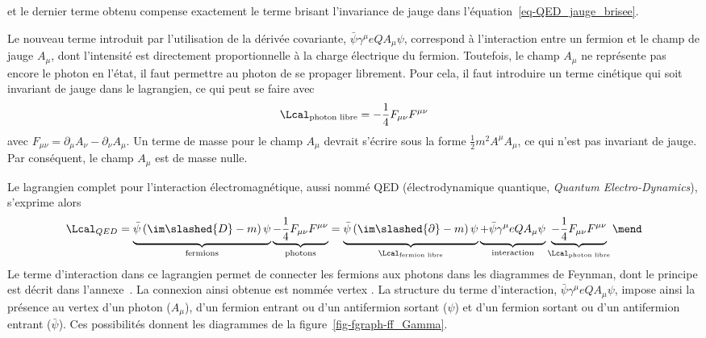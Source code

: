 et le dernier terme obtenu compense exactement le terme brisant l'invariance de jauge dans l'équation~\eqref{eq-QED_jauge_brisee}.
\par Le nouveau terme introduit par l'utilisation de la dérivée covariante, $\bar{\psi}\gamma^\mu eQA_\mu \psi$, correspond à l'interaction entre un fermion et le champ de jauge $A_\mu$, dont l'intensité est directement proportionnelle à la charge électrique du fermion.
Toutefois, le champ $A_\mu$ ne représente pas encore le photon en l'état, il faut permettre au photon de se propager librement. Pour cela, il faut introduire un terme cinétique qui soit invariant de jauge dans le lagrangien, ce qui peut se faire avec
\begin{equation}
\Lcal_{\text{photon libre}} = - \frac{1}{4} F_{\mu\nu}F^{\mu\nu}
\end{equation}
avec $F_{\mu\nu} = \partial_\mu A_\nu - \partial_\nu A_\mu$.
Un terme de masse pour le champ $A_\mu$ devrait s'écrire sous la forme $\frac{1}{2}m^2A^\mu A_\mu$, ce qui n'est pas invariant de jauge. Par conséquent, le champ $A_\mu$ est de masse nulle.
\par Le lagrangien complet pour l'interaction électromagnétique, aussi nommé QED (électrodynamique quantique, \emph{Quantum Electro-Dynamics}), s'exprime alors
\begin{equation}
\Lcal_{QED}
=
\underbrace{\bar{\psi} \left( \im\slashed{D} - m \right) \psi \vphantom{\frac{1}{4}}}_{\text{fermions}}
\underbrace{- \frac{1}{4} F_{\mu\nu}F^{\mu\nu} \vphantom{\frac{1}{4}}}_{\text{photons}}
=
\underbrace{\bar{\psi} \left( \im\slashed{\partial} - m \right) \psi \vphantom{\frac{1}{4}}}_{\Lcal_{\text{fermion libre}}}
\underbrace{+ \bar{\psi}\gamma^\mu eQA_\mu \psi \vphantom{\frac{1}{4}}}_{\text{interaction}}
\underbrace{- \frac{1}{4} F_{\mu\nu}F^{\mu\nu} \vphantom{\frac{1}{4}}}_{\Lcal_{\text{photon libre}}}
\mend
\end{equation}
Le terme d'interaction dans ce lagrangien permet de \og connecter \fg{} les fermions aux photons dans les diagrammes de Feynman, dont le principe est décrit dans l'annexe~.
La \og connexion \fg{} ainsi obtenue est nommée \og vertex \fg.
La structure du terme d'interaction, $\bar{\psi}\gamma^\mu eQA_\mu \psi$, impose ainsi la présence au vertex d'un photon ($A_\mu$), d'un fermion entrant ou d'un antifermion sortant ($\psi$) et d'un fermion sortant ou d'un antifermion entrant ($\bar{\psi}$). Ces possibilités donnent les diagrammes de la figure~\ref{fig-fgraph-ff_Gamma}.
